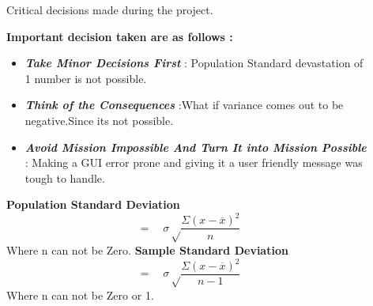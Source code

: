 \documentclass[final]{beamer}
\newlength{\sepwid}
\newlength{\onecolwid}
\newlength{\twocolwid}
\begin{document}
\begin{frame}[t]
\begin{columns}[t]
\begin{column}{\onecolwid}

\begin{block}{Critical decisions made during the project.}

\textbf{Important decision taken are as follows :}
\begin{itemize}
\item  \textit{\textbf{Take Minor Decisions First}} : Population Standard devastation of 1 number is not possible.\newline
\item  \textit{\textbf{Think of the Consequences}} :What if variance comes out to be negative.Since its not possible.\newline
\item \textit{\textbf{Avoid Mission Impossible And Turn It into Mission Possible }} : Making a GUI error prone and giving it a user friendly message was tough to handle.
\end{itemize}

\textbf{ Population Standard Deviation}\newline
 \begin{equation*}=
    \quad \sigma  \sqrt\frac{{\Sigma (x- \overline{x})^2}}{n}
  \end{equation*}
  Where n can not be Zero.
  \textbf{Sample Standard Deviation}
 \begin{equation*}=
    \quad \sigma  \sqrt\frac{{\Sigma (x- \overline{x})^2}}{n-1}
  \end{equation*}
  Where n can not be Zero or 1.
\end{block}




\end{column} %

\begin{column}{\sepwid}\end{column} %

\begin{column}{\twocolwid} %

\begin{columns}[t,totalwidth=\twocolwid] %

\begin{column}{\onecolwid}\vspace{-.6in} %


\end{column}
\end{columns}
\end{column}
\end{columns}
\end{frame}
\end{document}

